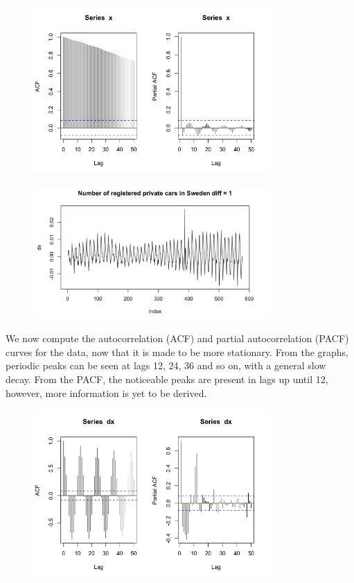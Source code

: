 \documentclass[a4paper,11pt]{article}
\begin{document}
    \begin{figure}[H]
        \centering
        \includegraphics[width=0.8\textwidth]{figure-markdown_strict/unnamed-chunk-1-3.png}
        \label{fig:f3}
    \end{figure}

    \begin{figure}[H]
        \centering
        \includegraphics[width=0.8\textwidth]{figure-markdown_strict/diff.png}
        \label{fig:f3}
    \end{figure}

    We now compute the autocorrelation (ACF) and partial autocorrelation (PACF) curves for the data, now that it is made to be more stationary. From the graphs, periodic peaks can be seen at lags 12, 24, 36 and so on, with a general slow decay. From the PACF, the noticeable peaks are present in lags up until 12, however, more information is yet to be derived. 

    \begin{figure}[H]
        \centering
        \includegraphics[width=0.8\textwidth]{figure-markdown_strict/unnamed-chunk-2-2.png}
        \label{fig:f4}
    \end{figure}
\end{document}
